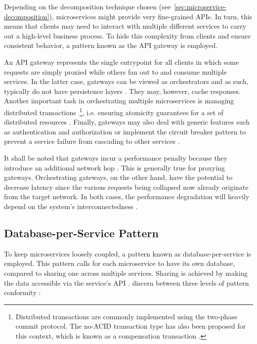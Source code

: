 Depending on the decomposition technique chosen (see~\autoref{sec:microservice-decomposition}), microservices might provide very fine-grained \acsp{API}. In turn, this means that clients may need to interact with multiple different services to carry out a high-level business process. To hide this complexity from clients and ensure consistent behavior, a pattern known as the \acs{API} gateway is employed.

An \acs{API} gateway represents the single entrypoint for all clients in which some requests are simply proxied while others fan out to and consume multiple services. In the latter case, gateways can be viewed as orchestrators and as such, typically do not have persistence layers \cite[p.~585]{villamizar2015evaluating}. They may, however, cache responses. Another important task in orchestrating multiple microservices is managing distributed transactions~\footnote{Distributed transactions are commonly implemented using the two-phase commit protocol. The no-\acs{ACID} transaction type has also been proposed for this context, which is known as a compensation transaction \cite[p.~32]{cerny2018contextual}.}, i.e. ensuring atomicity guarantees for a set of distributed resources \cite[p.~32]{cerny2018contextual}. Finally, gateways may also deal with generic features such as authentication and authorization or implement the circuit breaker pattern to prevent a service failure from cascading to other services \cite[p.~41]{kalske2017challenges} \cite[p.~37]{messina2016simplified}.

It shall be noted that gateways incur a performance penalty because they introduce an additional network hop \cite[p.~37]{messina2016simplified}. This is generally true for proxying gateways. Orchestrating gateways, on the other hand, have the potential to decrease latency since the various requests being collapsed now already originate from the target network. In both cases, the performance degradation will heavily depend on the system's interconnectedness \cite[p.~9]{dragoni2017microservices}.


\subsection{Database-per-Service Pattern}
\label{sec:database-per-service-pattern}

To keep microservices loosely coupled, a pattern known as database-per-service is employed. This pattern calls for each microservice to have its own database, compared to sharing one across multiple services. Sharing is achieved by making the data accessible via the service's \acs{API} \cite[p.~36]{messina2016simplified} \cite[p.~59]{taibi2018definition}. \citeauthor{messina2016simplified} discern between three levels of pattern conformity \cite[p.~37]{messina2016simplified}:

